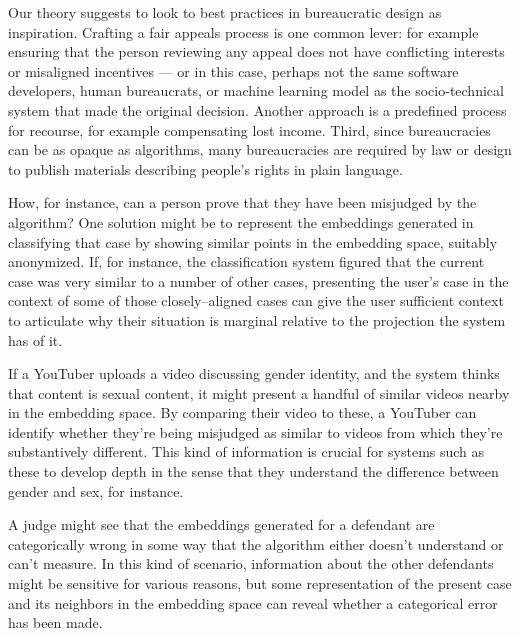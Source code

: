 \documentclass[main]{subfiles}
\begin{document}
Our theory suggests to look to best practices in bureaucratic design as inspiration.
Crafting a fair appeals process is one common lever: for example ensuring that
the person reviewing any appeal does not have conflicting interests or misaligned incentives
--- or in this case, perhaps not the same software developers, human bureaucrats, or machine learning model as the socio-technical system that made the original decision.
Another approach is a predefined process for recourse, for example compensating lost income.
Third, since bureaucracies can be as opaque as algorithms,
many bureaucracies are required by law or design to publish materials describing people’s rights in plain language.

How, for instance, can a person prove that they have been misjudged by the algorithm?
One solution might be to represent the embeddings generated in classifying that case by showing similar points in the embedding space, suitably anonymized.
If, for instance,
the classification system figured that the current case was very similar to a number of other cases,
presenting the user's case in the context of some of those closely--aligned cases
can give the user sufficient context to articulate why their situation is marginal relative to the projection the system has of it.

If a YouTuber uploads a video discussing gender identity, and
the system thinks that content is sexual content,
it might present a handful of similar videos nearby in the embedding space.
By comparing their video to these,
a YouTuber can identify whether they're being misjudged as similar to videos from which they're substantively different.
This kind of information is crucial for systems such as these to develop depth
in the sense that they understand the difference between gender and sex, for instance.

A judge might see that the embeddings generated for a defendant are
categorically wrong in some way that the algorithm either doesn't understand or can't measure.
In this kind of scenario,
information about the other defendants might be sensitive for various reasons, but
some representation of the present case and its neighbors in the embedding space can
reveal whether a categorical error has been made.
\end{document}
